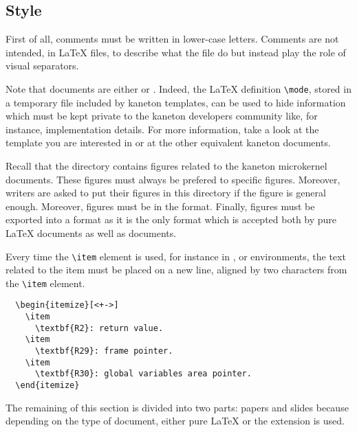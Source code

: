 %
%

\subsection{Style}

First of all, comments must be written in lower-case letters. Comments
are not intended, in {\LaTeX} files, to describe what the file do but instead
play the role of visual separators.

Note that documents are either  or . Indeed,
the {\LaTeX} definition \verb|\mode|, stored in a temporary file
included by kaneton templates, can be used to hide information which must be
kept private to the kaneton developers community like, for instance,
implementation details. For more information, take a look at the template
you are interested in or at the other equivalent kaneton documents.

Recall that the  directory contains figures related
to the kaneton microkernel documents. These figures must always be prefered
to specific figures. Moreover, writers are asked to put their figures in
this directory if the figure is general enough. Moreover, figures must be
in the  format. Finally, figures must be exported into a
 format as it is the only format which is accepted both by
pure {\LaTeX} documents as well as  documents.

Every time the \verb|\item| element is used, for instance in ,
or  environments, the text related to the item must be
placed on a new line, aligned by two characters from the \verb|\item| element.

\begin{verbatim}
  \begin{itemize}[<+->]
    \item
      \textbf{R2}: return value.
    \item
      \textbf{R29}: frame pointer.
    \item
      \textbf{R30}: global variables area pointer.
  \end{itemize}
\end{verbatim}

The remaining of this section is divided into two parts: papers and slides
because depending on the type of document, either pure {\LaTeX}
or the  extension is used.

